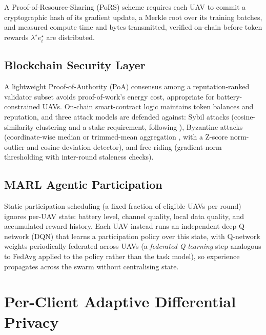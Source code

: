 \documentclass[journal]{IEEEtran}
\begin{document}
A Proof-of-Resource-Sharing (PoRS) scheme requires each UAV to commit a
cryptographic hash of its gradient update, a Merkle root over its
training batches, and measured compute time and bytes transmitted,
verified on-chain before token rewards $\lambda^\star e_i^\star$ are
distributed.

\subsection{Blockchain Security Layer}
A lightweight Proof-of-Authority (PoA) consensus among a reputation-ranked
validator subset avoids proof-of-work's energy cost, appropriate for
battery-constrained UAVs. On-chain smart-contract logic maintains token
balances and reputation, and three attack models are defended against:
Sybil attacks (cosine-similarity clustering and a stake requirement,
following \cite{fung2018}), Byzantine attacks (coordinate-wise median
or trimmed-mean aggregation \cite{yin2018,blanchard2017}, with a
Z-score norm-outlier and cosine-deviation detector), and free-riding
(gradient-norm thresholding with inter-round staleness checks).

\subsection{MARL Agentic Participation}
Static participation scheduling (a fixed fraction of eligible UAVs per
round) ignores per-UAV state: battery level, channel quality, local
data quality, and accumulated reward history. Each UAV instead runs an
independent deep Q-network (DQN) \cite{mnih2015} that learns a
participation policy over this state, with Q-network weights
periodically federated across UAVs (a \emph{federated Q-learning} step
analogous to FedAvg applied to the policy rather than the task model),
so experience propagates across the swarm without centralising state.

\section{Per-Client Adaptive Differential Privacy}
\label{sec:method-dp}
\end{document}
